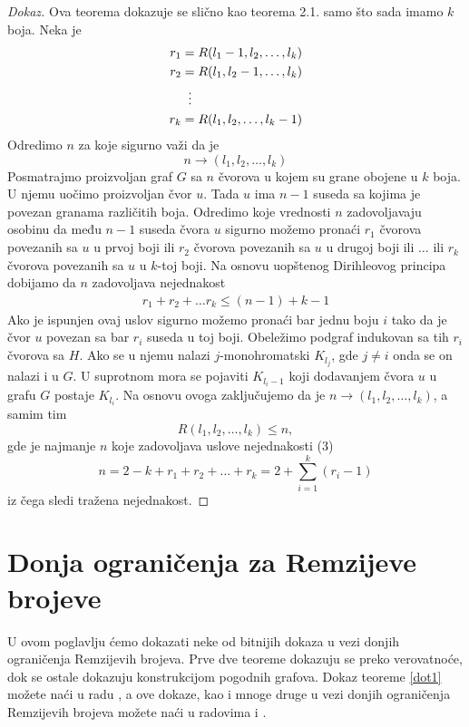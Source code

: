 \documentclass{article}
\theoremstyle{definition}
\newcommand{\dokaz}[1]{\begin{proof}[Dokaz]#1\end{proof}}
\begin{document}
	\dokaz{
		Ova teorema dokazuje se slično kao teorema 2.1. samo što sada imamo $k$ boja. Neka je
		\begin{align*}
		r_1 &= R(l_1 - 1, l_2, \dots, l_k) \\
		r_2 &= R(l_1, l_2 - 1, \dots, l_k) \\
		&\;\;\vdots \notag \\
		r_k &= R(l_1, l_2, \dots, l_k - 1) \\
		\end{align*}
		Odredimo $n$ za koje sigurno važi da je 
		$$n \rightarrow (l_1, l_2, \dots, l_k)$$
		Posmatrajmo proizvoljan graf $G$ sa $n$ čvorova u kojem su grane obojene u $k$ boja.
		U njemu uočimo proizvoljan čvor $u$. Tada $u$ ima $n - 1$ 
		suseda sa kojima je povezan granama različitih boja. Odredimo koje vrednosti $n$ zadovoljavaju osobinu da među $n - 1$ suseda čvora $u$ sigurno
		možemo pronaći $r_1$ čvorova povezanih sa $u$ u prvoj boji ili $r_2$ čvorova povezanih sa $u$ u drugoj boji ili $\dots$ ili $r_k$ čvorova povezanih sa 		$u$ u $k$-toj boji. Na osnovu uopštenog Dirihleovog principa dobijamo da $n$ zadovoljava nejednakost
		\begin{align} r_1 + r_2 + \dots r_k \leq (n - 1) + k - 1 \end{align}
		Ako je ispunjen ovaj uslov sigurno možemo pronaći bar jednu boju $i$ tako da je čvor $u$ povezan sa bar $r_i$ suseda u toj boji. Obeležimo podgraf
		indukovan sa tih $r_i$ čvorova sa $H$. Ako se u njemu nalazi $j$-monohromatski $K_{l_j}$, gde $j \neq i$ onda se on nalazi i u $G$. U suprotnom mora          
		se pojaviti $K_{l_i - 1}$ koji dodavanjem čvora $u$ u grafu $G$ postaje $K_{l_i}$. Na osnovu ovoga zaključujemo da je 
		$n \rightarrow (l_1, l_2, \dots, l_k)$, a samim tim \newline
		$$R(l_1, l_2, \dots, l_k) \leq n,$$ gde je najmanje $n$ koje zadovoljava uslove nejednakosti (3)
		$$n = 2 - k + r_1 + r_2 + \dots + r_k = 2 + \sum_{i = 1}^{k} (r_i - 1)$$
		iz čega sledi tražena nejednakost.
		
	}
	
	\section{Donja ograničenja za Remzijeve brojeve} \label{donjeGranicePoglavlje}
	
	U ovom poglavlju ćemo dokazati neke
	od bitnijih dokaza u vezi donjih ograničenja Remzijevih brojeva. Prve dve teoreme dokazuju se preko verovatnoće, dok se ostale dokazuju 				konstrukcijom pogodnih grafova.
	Dokaz teoreme \ref{dot1} možete naći u radu \cite{theBook}, a ove dokaze, kao i mnoge druge u vezi donjih ograničenja Remzijevih brojeva možete naći u radovima \cite{mathPaulErdos} i \cite{remziGr}.
	
\end{document}
